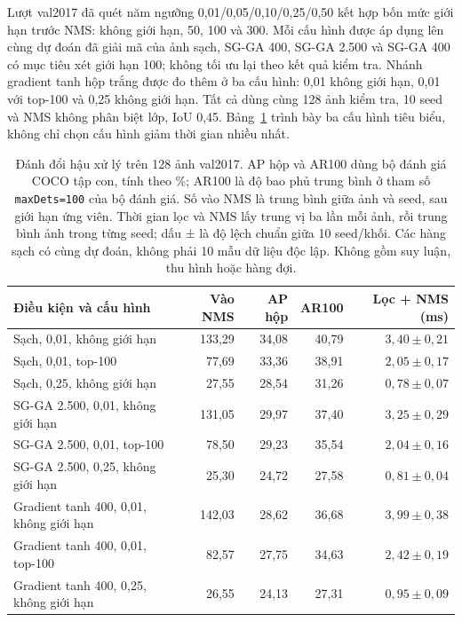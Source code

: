 \documentclass[a4paper,fleqn]{cas-dc}
\begin{document}
Lượt val2017 đã quét năm ngưỡng 0,01/0,05/0,10/0,25/0,50 kết hợp bốn mức giới hạn trước NMS: không giới hạn, 50, 100 và 300. Mỗi cấu hình được áp dụng lên cùng dự đoán đã giải mã của ảnh sạch, SG-GA 400, SG-GA 2.500 và SG-GA 400 có mục tiêu xét giới hạn 100; không tối ưu lại theo kết quả kiểm tra. Nhánh gradient tanh hộp trắng được đo thêm ở ba cấu hình: 0,01 không giới hạn, 0,01 với top-100 và 0,25 không giới hạn. Tất cả dùng cùng 128 ảnh kiểm tra, 10 seed và NMS không phân biệt lớp, IoU 0,45. Bảng~\ref{tab:extended_defenses} trình bày ba cấu hình tiêu biểu, không chỉ chọn cấu hình giảm thời gian nhiều nhất.

\begin{table}[t]
\centering
\small
\caption{Đánh đổi hậu xử lý trên 128 ảnh val2017. AP hộp và AR100 dùng bộ đánh giá COCO tập con, tính theo \%; AR100 là độ bao phủ trung bình ở tham số \texttt{maxDets=100} của bộ đánh giá. Số vào NMS là trung bình giữa ảnh và seed, sau giới hạn ứng viên. Thời gian lọc và NMS lấy trung vị ba lần mỗi ảnh, rồi trung bình ảnh trong từng seed; dấu ± là độ lệch chuẩn giữa 10 seed/khối. Các hàng sạch có cùng dự đoán, không phải 10 mẫu dữ liệu độc lập. Không gồm suy luận, thu hình hoặc hàng đợi.}
\begin{tabularx}{\textwidth}{Xrrrr}
\toprule
Điều kiện và cấu hình & Vào NMS & AP hộp & AR100 & Lọc + NMS (ms) \\
\midrule
Sạch, 0,01, không giới hạn & 133,29 & 34,08 & 40,79 & $3{,}40\pm0{,}21$ \\
Sạch, 0,01, top-100 & 77,69 & 33,36 & 38,91 & $2{,}05\pm0{,}17$ \\
Sạch, 0,25, không giới hạn & 27,55 & 28,54 & 31,26 & $0{,}78\pm0{,}07$ \\
SG-GA 2.500, 0,01, không giới hạn & 131,05 & 29,97 & 37,40 & $3{,}25\pm0{,}29$ \\
SG-GA 2.500, 0,01, top-100 & 78,50 & 29,23 & 35,54 & $2{,}04\pm0{,}16$ \\
SG-GA 2.500, 0,25, không giới hạn & 25,30 & 24,72 & 27,58 & $0{,}81\pm0{,}04$ \\
Gradient tanh 400, 0,01, không giới hạn & 142,03 & 28,62 & 36,68 & $3{,}99\pm0{,}38$ \\
Gradient tanh 400, 0,01, top-100 & 82,57 & 27,75 & 34,63 & $2{,}42\pm0{,}19$ \\
Gradient tanh 400, 0,25, không giới hạn & 26,55 & 24,13 & 27,31 & $0{,}95\pm0{,}09$ \\
\bottomrule
\end{tabularx}
\label{tab:extended_defenses}
\end{table}
\end{document}
